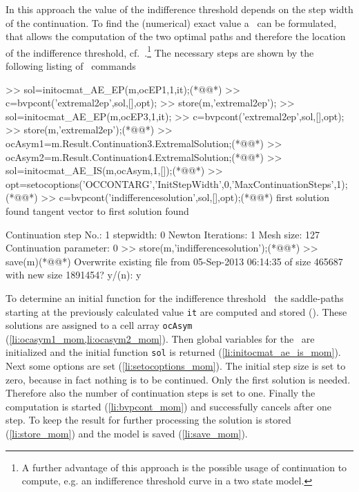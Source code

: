 In this approach the value of the indifference threshold depends on the step width of the continuation. To find the (numerical) exact value a \BVP\ can be formulated, that allows the computation of the two optimal paths and therefore the location of the indifference threshold, cf.~\citet{grass2012}.\footnote{A further advantage of this approach is the possible usage of continuation to compute, e.g. an indifference threshold curve in a two state model.} The necessary steps are shown by the following listing of \OCMAT\ commands 
\begin{matlabnum} 
>> sol=initocmat_AE_EP(m,ocEP{1},1,it);(*@\label{li:initocmat_ae_ep_mom}@*)
>> c=bvpcont('extremal2ep',sol,[],opt);
>> store(m,'extremal2ep');
>> sol=initocmat_AE_EP(m,ocEP{3},1,it);
>> c=bvpcont('extremal2ep',sol,[],opt);
>> store(m,'extremal2ep');(*@\label{li:m_store_mom}@*)
>> ocAsym{1}=m.Result.Continuation{3}.ExtremalSolution;(*@\label{li:ocasym1_mom}@*)
>> ocAsym{2}=m.Result.Continuation{4}.ExtremalSolution;(*@\label{li:ocasym2_mom}@*)
>> sol=initocmat_AE_IS(m,ocAsym,1,[]);(*@\label{li:initocmat_ae_is_mom}@*)
>> opt=setocoptions('OCCONTARG','InitStepWidth',0,'MaxContinuationSteps',1);(*@\label{li:setocoptions_mom}@*)
>> c=bvpcont('indifferencesolution',sol,[],opt);(*@\label{li:bvpcont_mom}@*)
first solution found
tangent vector to first solution found

 Continuation step No.: 1
 stepwidth: 0
 Newton Iterations: 1
 Mesh size: 127
 Continuation parameter: 0
>> store(m,'indifferencesolution');(*@\label{li:store_mom}@*)
>> save(m)(*@\label{li:save_mom}@*)
Overwrite existing file from 05-Sep-2013 06:14:35 of size 465687 with new size 1891454?  y/(n): y
\end{matlabnum}
To determine an initial function for the indifference threshold \BVP\ the saddle-paths starting at the previously calculated value \lstinline+it+ are computed and stored (). These solutions are assigned to a cell array \lstinline+ocAsym+ (\cref{li:ocasym1_mom,li:ocasym2_mom}). Then global variables for the \BVP\ are initialized and the initial function \lstinline+sol+ is returned (\cref{li:initocmat_ae_is_mom}). Next some options are set (\cref{li:setocoptions_mom}). The initial step size is set to zero, because in fact nothing is to be continued. Only the first solution is needed. Therefore also the number of continuation steps is set to one. Finally the computation is started (\cref{li:bvpcont_mom}) and successfully cancels after one step. To keep the result for further processing the solution is stored (\cref{li:store_mom}) and the model is saved (\cref{li:save_mom}).
